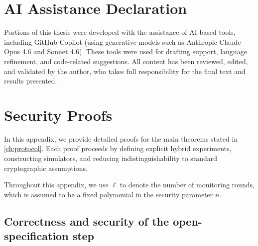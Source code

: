 \appendix

\chapter*{AI Assistance Declaration}

Portions of this thesis were developed with the assistance of AI-based tools,
including GitHub Copilot (using generative models such as Anthropic Claude Opus 4.6
and Sonnet 4.6). These tools were used for drafting support, language refinement,
and code-related suggestions. All content has been reviewed, edited, and validated
by the author, who takes full responsibility for the final text and results
presented.

\chapter{Security Proofs}\label{app:proofs}

In this appendix, we provide detailed proofs for the main theorems stated in \cref{ch:protocol}. Each proof proceeds by defining explicit hybrid experiments, constructing simulators, and reducing indistinguishability to standard cryptographic assumptions.

Throughout this appendix, we use $\ell$ to denote the number of monitoring rounds, which is assumed to be a fixed polynomial in the security parameter $n$.

\section{Correctness and security of the open-specification step}\label{sec:proof1}

\Protocolonesecure*

